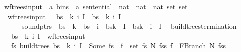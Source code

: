 \begin{isabellebody}
\isanewline
{}\isamarkupfalse%
\ wf{\isacharunderscore}{\kern0pt}trees{\isacharunderscore}{\kern0pt}input\ {\isacharcolon}{\kern0pt}{\isacharcolon}{\kern0pt}\ {\isachardoublequoteopen}{\isacharparenleft}{\kern0pt}{\isacharprime}{\kern0pt}a\ bins\ {\isasymtimes}\ {\isacharprime}{\kern0pt}a\ sentential\ {\isasymtimes}\ nat\ {\isasymtimes}\ nat\ {\isasymtimes}\ nat\ set{\isacharparenright}{\kern0pt}\ set{\isachardoublequoteclose}\ \isanewline
\ \ {\isachardoublequoteopen}wf{\isacharunderscore}{\kern0pt}trees{\isacharunderscore}{\kern0pt}input\ {\isacharequal}{\kern0pt}\ {\isacharbraceleft}{\kern0pt}\ {\isacharparenleft}{\kern0pt}bs{\isacharcomma}{\kern0pt}\ {\isasymomega}{\isacharcomma}{\kern0pt}\ k{\isacharcomma}{\kern0pt}\ i{\isacharcomma}{\kern0pt}\ I{\isacharparenright}{\kern0pt}\ {\isacharbar}{\kern0pt}\ bs\ {\isasymomega}\ k\ i\ I{\isachardot}{\kern0pt}\isanewline
\ \ \ \ \ \ sound{\isacharunderscore}{\kern0pt}ptrs\ {\isasymomega}\ bs\ {\isasymand}\ k\ {\isacharless}{\kern0pt}\ {\isacharbar}{\kern0pt}bs{\isacharbar}{\kern0pt}\ {\isasymand}\ i\ {\isacharless}{\kern0pt}\ {\isacharbar}{\kern0pt}bs{\isacharbang}{\kern0pt}k{\isacharbar}{\kern0pt}\ {\isasymand}\ I\ {\isasymsubseteq}\ {\isacharbraceleft}{\kern0pt}{}{\isachardot}{\kern0pt}{\isachardot}{\kern0pt}{\isacharless}{\kern0pt}{\isacharbar}{\kern0pt}bs{\isacharbang}{\kern0pt}k{\isacharbar}{\kern0pt}{\isacharbraceright}{\kern0pt}\ {\isasymand}\ i\ {\isasymin}\ I\ {\isacharbraceright}{\kern0pt}{\isachardoublequoteclose}\isanewline
\isanewline
{}\isamarkupfalse%
\ build{\isacharunderscore}{\kern0pt}trees{\isacharprime}{\kern0pt}{\isacharunderscore}{\kern0pt}termination{\isacharcolon}{\kern0pt}\isanewline
\ \ \ {\isachardoublequoteopen}{\isacharparenleft}{\kern0pt}bs{\isacharcomma}{\kern0pt}\ {\isasymomega}{\isacharcomma}{\kern0pt}\ k{\isacharcomma}{\kern0pt}\ i{\isacharcomma}{\kern0pt}\ I{\isacharparenright}{\kern0pt}\ {\isasymin}\ wf{\isacharunderscore}{\kern0pt}trees{\isacharunderscore}{\kern0pt}input{\isachardoublequoteclose}\isanewline
\ \ \ {\isachardoublequoteopen}{\isasymexists}fs{\isachardot}{\kern0pt}\ build{\isacharunderscore}{\kern0pt}trees{\isacharprime}{\kern0pt}\ bs\ {\isasymomega}\ k\ i\ I\ {\isacharequal}{\kern0pt}\ Some\ fs\ {\isasymand}\ {\isacharparenleft}{\kern0pt}{\isasymforall}f\ {\isasymin}\ set\ fs{\isachardot}{\kern0pt}\ {\isasymexists}N\ fss{\isachardot}{\kern0pt}\ f\ {\isacharequal}{\kern0pt}\ FBranch\ N\ fss{\isacharparenright}{\kern0pt}{\isachardoublequoteclose}%
\isadelimproof

\end{isabellebody}
